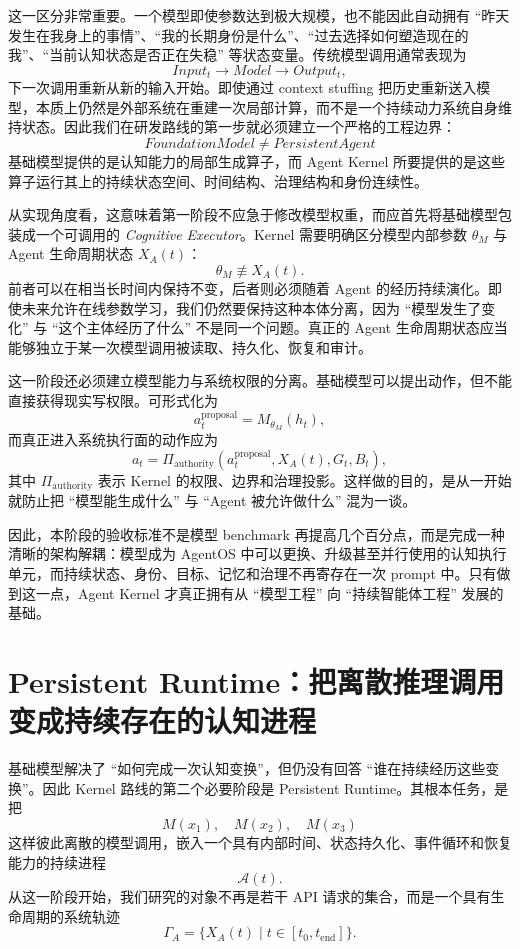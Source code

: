 这一区分非常重要。一个模型即使参数达到极大规模，也不能因此自动拥有 ``昨天发生在我身上的事情''、``我的长期身份是什么''、``过去选择如何塑造现在的我''、``当前认知状态是否正在失稳'' 等状态变量。传统模型调用通常表现为
\[
Input_t \rightarrow Model \rightarrow Output_t,
\]
下一次调用重新从新的输入开始。即使通过 context stuffing 把历史重新送入模型，本质上仍然是外部系统在重建一次局部计算，而不是一个持续动力系统自身维持状态。因此我们在研发路线的第一步就必须建立一个严格的工程边界：
\[
\boxed{
FoundationModel \neq PersistentAgent
}
\]
基础模型提供的是认知能力的局部生成算子，而 Agent Kernel 所要提供的是这些算子运行其上的持续状态空间、时间结构、治理结构和身份连续性。

从实现角度看，这意味着第一阶段不应急于修改模型权重，而应首先将基础模型包装成一个可调用的 \emph{Cognitive Executor}。Kernel 需要明确区分模型内部参数 $\theta_M$ 与 Agent 生命周期状态 $X_A(t)$：
\[
\theta_M \not\equiv X_A(t).
\]
前者可以在相当长时间内保持不变，后者则必须随着 Agent 的经历持续演化。即使未来允许在线参数学习，我们仍然要保持这种本体分离，因为 ``模型发生了变化'' 与 ``这个主体经历了什么'' 不是同一个问题。真正的 Agent 生命周期状态应当能够独立于某一次模型调用被读取、持久化、恢复和审计。

这一阶段还必须建立模型能力与系统权限的分离。基础模型可以提出动作，但不能直接获得现实写权限。可形式化为
\[
a_t^{\mathrm{proposal}}
=
M_{\theta_M}(h_t),
\]
而真正进入系统执行面的动作应为
\[
a_t
=
\Pi_{\mathrm{authority}}
\left(
a_t^{\mathrm{proposal}},
X_A(t),
G_t,
B_t
\right),
\]
其中 $\Pi_{\mathrm{authority}}$ 表示 Kernel 的权限、边界和治理投影。这样做的目的，是从一开始就防止把 ``模型能生成什么'' 与 ``Agent 被允许做什么'' 混为一谈。

因此，本阶段的验收标准不是模型 benchmark 再提高几个百分点，而是完成一种清晰的架构解耦：模型成为 AgentOS 中可以更换、升级甚至并行使用的认知执行单元，而持续状态、身份、目标、记忆和治理不再寄存在一次 prompt 中。只有做到这一点，Agent Kernel 才真正拥有从 ``模型工程'' 向 ``持续智能体工程'' 发展的基础。

\section{Persistent Runtime：把离散推理调用变成持续存在的认知进程}

基础模型解决了 ``如何完成一次认知变换''，但仍没有回答 ``谁在持续经历这些变换''。因此 Kernel 路线的第二个必要阶段是 Persistent Runtime。其根本任务，是把
\[
M(x_1),\quad M(x_2),\quad M(x_3)
\]
这样彼此离散的模型调用，嵌入一个具有内部时间、状态持久化、事件循环和恢复能力的持续进程
\[
\mathcal A(t).
\]
从这一阶段开始，我们研究的对象不再是若干 API 请求的集合，而是一个具有生命周期的系统轨迹
\[
\Gamma_A
=
\{X_A(t)\mid t\in[t_0,t_{\mathrm{end}}]\}.
\]

